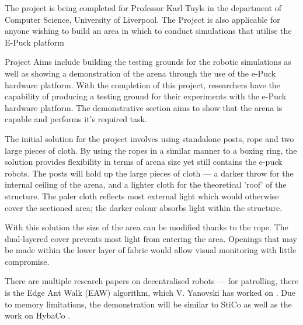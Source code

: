 The project is being completed for Professor Karl Tuyls in the
department of Computer Science, University of Liverpool.
The Project is also applicable for anyone wishing to build an area in which to
conduct simulations that utilise the E-Puck platform\cite{ePuckSite}

Project Aims include building the testing grounds for the robotic simulations as
well as showing a demonstration of the arena through the use of the e-Puck
hardware platform.  With the completion of this project, researchers have the
capability of producing a testing ground for their experiments with the e-Puck
hardware platform.  The demonstrative section aims to show that the arena is
capable and performs it's required task.

The initial solution for the project involves using standalone posts, rope and
two large pieces of cloth.  By using the ropes in a similar manner to a boxing
ring, the solution provides flexibility in terms of arena size yet still 
contains the e-puck robots.  The posts will hold up the large pieces of cloth
--- a darker throw for the internal ceiling of the arena, and a lighter cloth
for the theoretical 'roof' of the structure.  The paler cloth reflects most 
external light which would otherwise cover the sectioned
area; the darker colour absorbs light within the structure.

With this solution the size of the area can be modified thanks to the rope.
The dual-layered cover prevents most light from entering the area.
Openings that may be made within the lower layer of fabric would allow
visual monitoring with little compromise.

There are multiple research papers on decentralised robots --- for patrolling,
there is the Edge Ant Walk (EAW) algorithm, which V. Yanovski has worked on
\cite{Yanovski2003}.  Due to memory limitations, the demonstration will be 
similar to StiCo\cite{Ranjbar-Sahraei2012} as well as the work on HybaCo
\cite{Broecker2015}.